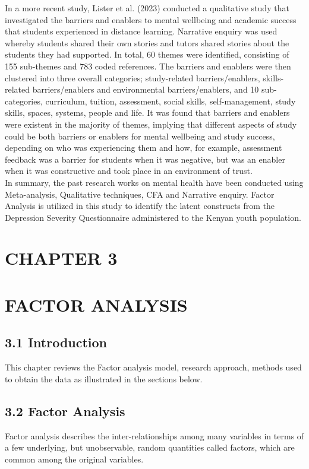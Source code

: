 \documentclass[12pt]{article}
\begin{document}
\noindent In a more recent study, Lister et al. (2023) conducted a qualitative study that investigated the barriers and enablers to mental wellbeing and academic success that students experienced in distance learning. Narrative enquiry was used whereby students shared their own stories and tutors shared stories about the students they had supported. In total, 60 themes were identified, consisting of 155 sub-themes and 783 coded references. The barriers and enablers were then clustered into three overall categories; study-related barriers/enablers, skills-related barriers/enablers and environmental barriers/enablers, and 10 sub-categories, curriculum, tuition, assessment, social skills, self-management, study skills, spaces, systems, people and life. It was found that barriers and enablers were existent in the majority of themes, implying that different aspects of study could be both barriers or enablers for mental wellbeing and study success, depending on who was experiencing them and how, for example, assessment feedback was a barrier for students when it was negative, but was an enabler when it was constructive and took place in an environment of trust.\\


\noindent In summary, the past research works on mental health have been conducted using Meta-analysis, Qualitative techniques, CFA and Narrative enquiry. Factor Analysis is utilized in this study to identify the latent constructs from the Depression Severity Questionnaire administered to the Kenyan youth population.\\

\newpage

\section*{CHAPTER 3}
\section*{FACTOR ANALYSIS}
\subsection*{3.1 Introduction}
This chapter reviews the Factor analysis model, research approach, methods used to obtain the data as illustrated in the sections below.

\subsection*{3.2 Factor Analysis}
Factor analysis describes the inter-relationships among many variables in terms of a few underlying, but unobservable, random quantities called factors, which are common among the original variables.\\
\end{document}
